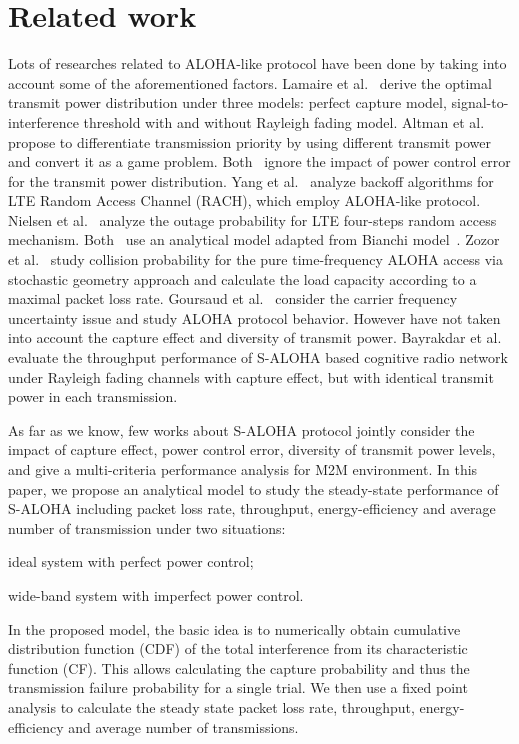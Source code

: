 \section{Related work}
Lots of researches related to ALOHA-like protocol have been done by taking into account some of the aforementioned factors. Lamaire et al.~\cite{lamaire1998randomization} derive the optimal transmit power distribution under three models: perfect capture model, signal-to-interference threshold with and without Rayleigh fading model. Altman et al.~\cite{altman2005slotted} propose to differentiate transmission priority by using different transmit power and convert it as a game problem. Both~\cite{lamaire1998randomization}\cite{altman2005slotted} ignore the impact of power control error for the transmit power distribution. 
Yang et al.~\cite{yang2012performance} analyze backoff algorithms for LTE Random Access Channel (RACH), which employ ALOHA-like protocol. Nielsen et al.~\cite{nielsen2015tractable} analyze the outage probability for LTE four-steps random access mechanism. Both~\cite{yang2012performance}\cite{nielsen2015tractable} use an analytical model adapted from Bianchi model~\cite{bianchi2000performance}. 
Zozor et al.~\cite{zozor2016time} study collision probability for the pure time-frequency ALOHA access via stochastic geometry approach and calculate the load capacity according to a maximal packet loss rate. 
Goursaud et al.~\cite{goursaud2016random} consider the carrier frequency uncertainty issue and study ALOHA protocol behavior. However \cite{yang2012performance}\cite{nielsen2015tractable}\cite{bianchi2000performance}\cite{zozor2016time}\cite{goursaud2016random} have not taken into account the capture effect and diversity of transmit power.
Bayrakdar et al.~\cite{bayrakdar2016slotted} evaluate the throughput performance of S-ALOHA based cognitive radio network under Rayleigh fading channels with capture effect, but with identical transmit power in each transmission. 


As far as we know, few works about S-ALOHA protocol jointly consider the impact of capture effect, power control error, diversity of transmit power levels, and give a multi-criteria performance analysis for M2M environment. In this paper, we propose an analytical model to study the steady-state performance of S-ALOHA including packet loss rate, throughput, energy-efficiency and average number of transmission under two situations: \begin{inparaenum}[1)]
	\item ideal system with perfect power control;
	\item wide-band system with imperfect power control.
\end{inparaenum} 
In the proposed model, the basic idea is to numerically obtain cumulative distribution function (CDF) of the total interference from its characteristic function (CF). This allows calculating the capture probability and thus the transmission failure probability for a single trial. We then use a fixed point analysis to calculate the steady state packet loss rate, throughput, energy-efficiency and average number of transmissions.